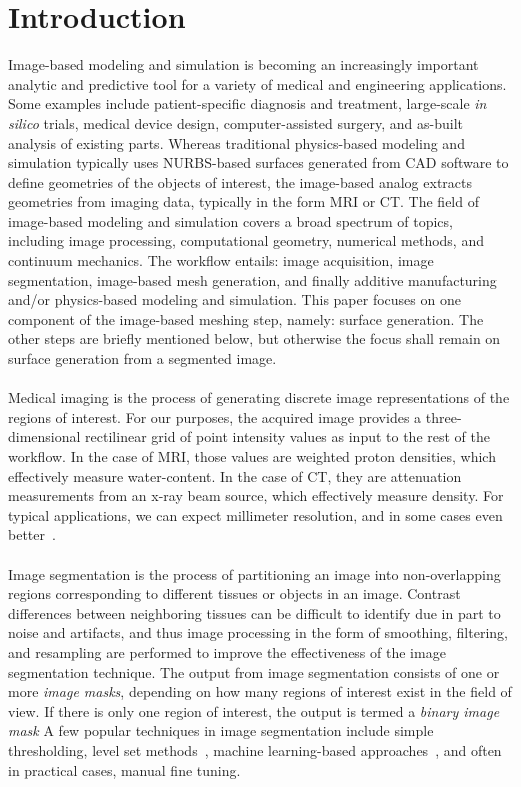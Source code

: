 \section{Introduction}

Image-based modeling and simulation is becoming an increasingly important analytic and predictive tool for a variety of medical and engineering applications. Some examples include patient-specific diagnosis and treatment, large-scale \textit{in silico} trials, medical device design, computer-assisted surgery, and as-built analysis of existing parts. Whereas traditional physics-based modeling and simulation typically uses NURBS-based surfaces generated from CAD software to define geometries of the objects of interest, the image-based analog extracts geometries from imaging data, typically in the form MRI or CT. The field of image-based modeling and simulation covers a broad spectrum of topics, including image processing, computational geometry, numerical methods, and continuum mechanics. The workflow entails: image acquisition, image segmentation, image-based mesh generation, and finally additive manufacturing and/or physics-based modeling and simulation. This paper focuses on one component of the image-based meshing step, namely: surface generation. The other steps are briefly mentioned below, but otherwise the focus shall remain on surface generation from a segmented image. \\ \\
%
Medical imaging is the process of generating discrete image representations of the regions of interest. For our purposes, the acquired image provides  a three-dimensional rectilinear grid of point intensity values as input to the rest of the workflow. In the case of MRI, those values are weighted proton densities, which effectively measure water-content. In the case of CT, they are attenuation measurements from an x-ray beam source, which effectively measure density. For typical applications, we can expect millimeter resolution, and in some cases even better~\cite{van2012super}.\\ \\
%
Image segmentation is the process of partitioning an image into non-overlapping regions corresponding to different tissues or objects in an image. Contrast differences between neighboring tissues can be difficult to identify due in part to noise and artifacts, and thus image processing in the form of smoothing, filtering, and resampling are performed to improve the effectiveness of the image segmentation technique. The output from image segmentation consists of one or more \textit{image masks}, depending on how many regions of interest exist in the field of view. If there is only one region of interest, the output is termed a \textit{binary image mask} A few popular techniques in image segmentation include simple thresholding, level set methods~\cite{malladi_1995, sethian_1996}, machine learning-based approaches~\cite{litjens_2017}, and often in practical cases, manual fine tuning.\\ \\
